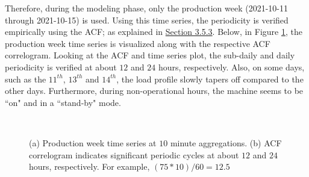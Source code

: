 Therefore, during the modeling phase, only the production week (2021-10-11 through 2021-10-15) is used. Using this time series, the periodicity is verified empirically using the ACF; as explained in \hyperlink{subsubsection.3.5.3}{Section 3.5.3}. Below, in Figure \ref{fig:fig10}, the production week time series is visualized along with the respective ACF correlogram. Looking at the ACF and time series plot, the sub-daily and daily periodicity is verified at about $12$ and $24$ hours, respectively. Also, on some days, such as the $11^{th}$, $13^{th}$ and $14^{th}$, the load profile slowly tapers off compared to the other days. Furthermore, during non-operational hours, the machine seems to be ``on" and in a ``stand-by" mode.  

\begin{figure}[H]
    \centering
    \graphicspath{ {./images/} }
     \\
    \caption{(a) Production week time series at $10$ minute aggregations. (b) ACF correlogram indicates significant periodic cycles at about $12$ and $24$ hours, respectively. For example, $(75*10) / 60 = 12.5$} 
    \label{fig:fig10}
\end{figure}

